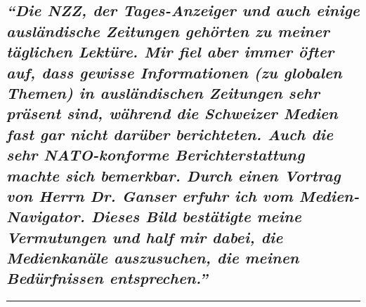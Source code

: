 \hypertarget{die-nzz-der-tages-anzeiger-und-auch-einige-ausluxe4ndische-zeitungen-gehuxf6rten-zu-meiner-tuxe4glichen-lektuxfcre-mir-fiel-aber-immer-uxf6fter-auf-dass-gewisse-informationen-zu-globalen-themen-in-ausluxe4ndischen-zeitungen-sehr-pruxe4sent-sind-wuxe4hrend-die-schweizer-medien-fast-gar-nicht-daruxfcber-berichteten-auch-die-sehr-nato-konforme-berichterstattung-machte-sich-bemerkbar-durch-einen-vortrag-von-herrn-dr-ganser-erfuhr-ich-vom-medien-navigator-dieses-bild-bestuxe4tigte-meine-vermutungen-und-half-mir-dabei-die-medienkanuxe4le-auszusuchen-die-meinen-beduxfcrfnissen-entsprechen}{%
\subsection{\texorpdfstring{\emph{``Die NZZ, der Tages-Anzeiger und auch
einige ausländische Zeitungen gehörten zu meiner täglichen Lektüre. Mir
fiel aber immer öfter auf, dass gewisse Informationen (zu globalen
Themen) in ausländischen Zeitungen sehr präsent sind, während die
Schweizer Medien fast gar nicht darüber berichteten. Auch die sehr
NATO-konforme Berichterstattung machte sich bemerkbar. Durch einen
Vortrag von Herrn Dr. Ganser erfuhr ich vom Medien-Navigator. Dieses
Bild bestätigte meine Vermutungen und half mir dabei, die Medienkanäle
auszusuchen, die meinen Bedürfnissen
entsprechen.''}}{``Die NZZ, der Tages-Anzeiger und auch einige ausländische Zeitungen gehörten zu meiner täglichen Lektüre. Mir fiel aber immer öfter auf, dass gewisse Informationen (zu globalen Themen) in ausländischen Zeitungen sehr präsent sind, während die Schweizer Medien fast gar nicht darüber berichteten. Auch die sehr NATO-konforme Berichterstattung machte sich bemerkbar. Durch einen Vortrag von Herrn Dr. Ganser erfuhr ich vom Medien-Navigator. Dieses Bild bestätigte meine Vermutungen und half mir dabei, die Medienkanäle auszusuchen, die meinen Bedürfnissen entsprechen.''}}\label{die-nzz-der-tages-anzeiger-und-auch-einige-ausluxe4ndische-zeitungen-gehuxf6rten-zu-meiner-tuxe4glichen-lektuxfcre-mir-fiel-aber-immer-uxf6fter-auf-dass-gewisse-informationen-zu-globalen-themen-in-ausluxe4ndischen-zeitungen-sehr-pruxe4sent-sind-wuxe4hrend-die-schweizer-medien-fast-gar-nicht-daruxfcber-berichteten-auch-die-sehr-nato-konforme-berichterstattung-machte-sich-bemerkbar-durch-einen-vortrag-von-herrn-dr-ganser-erfuhr-ich-vom-medien-navigator-dieses-bild-bestuxe4tigte-meine-vermutungen-und-half-mir-dabei-die-medienkanuxe4le-auszusuchen-die-meinen-beduxfcrfnissen-entsprechen}}

\begin{center}\rule{0.5\linewidth}{\linethickness}\end{center}

